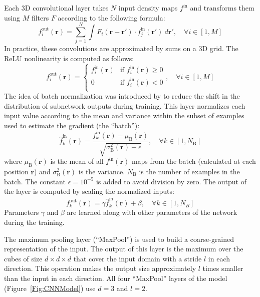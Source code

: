 \documentclass{bioinfo}
\begin{document}
Each 3D convolutional layer takes $N$ input density maps $f^\text{in}$
and transforms them using $M$ filters $F$ according to the following
formula:
\begin{equation}
f^\text{out}_i (\mathbf{r}) = \sum^{N}_{j=1} \int F_i (\mathbf{r} - \mathbf{r'}) \cdot f^\text{in}_j(\mathbf{r'}) ~d\mathbf{r'}, \quad\forall i \in [1,M]
\end{equation}
In practice, these convolutions are approximated by sums on a 3D grid.
The ReLU nonlinearity is computed as follows:
\begin{equation}
f^\text{out}_i (\mathbf{r}) = \begin{cases}
               f^\text{in}_i(\mathbf{r}) &\text{if } f^\text{in}_i(\mathbf{r})\geq 0\\
               0                         &\text{if } f^\text{in}_i(\mathbf{r})<0\\
            \end{cases}, \quad\forall i \in [1,M]
\end{equation}
The idea of batch normalization was introduced by 
\citet{ioffe2015batch} to reduce the shift in the distribution of
subnetwork outputs during training. This layer normalizes each input
value according to the mean and variance within the subset of examples
used to estimate the gradient (the ``batch''):
\begin{equation}
\hat{f}^\text{in}_k(\mathbf{r}) = \frac{f^\text{in}_k(\mathbf{r}) - \mu_\text{B}(\mathbf{r})}{\sqrt{\sigma^{2}_\text{B}(\mathbf{r}) + \epsilon}}, \quad\forall k \in [1,N_\text{B}]
\end{equation}
where $\mu_\text{B}(\mathbf{r})$ is the mean of all
$f^\text{in}(\mathbf{r})$ maps from the batch (calculated at each
position $\mathbf{r}$) and $\sigma^{2}_\text{B}(\mathbf{r})$ is the
variance. $N_\text{B}$ is the number of examples in the batch. The constant
$\epsilon = 10^{-5}$ is added to avoid division by zero.
The output of the layer is computed by scaling the normalized inputs:
\begin{equation}
f^\text{out}_k(\mathbf{r}) = \gamma \hat{f}^\text{in}_k(\mathbf{r}) + \beta, \quad\forall k \in [1,N_B]
\end{equation}
Parameters $\gamma$ and $\beta$ are learned along with other
parameters of the network during the training.

The maximum pooling layer (``MaxPool'') is used to build a
coarse-grained representation of the input. The output of this layer
is the maximum over the cubes of size $d \times d \times d$ that cover
the input domain with a stride $l$ in each direction.  This operation
makes the output size approximately $l$ times smaller than the
input in each direction.  All four ``MaxPool'' layers of the model
(Figure~\ref{Fig:CNNModel}) use $d=3$ and $l=2$.
\end{document}
